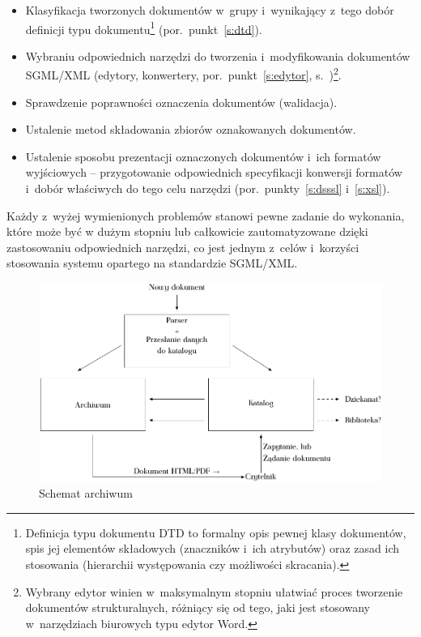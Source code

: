 \documentclass[brudnopis,xodstep]{xmgr}
\begin{document}
\begin{itemize}
\item Klasyfikacja tworzonych dokumentów w~grupy i~wynikający z~tego
  dobór definicji typu dokumentu\footnote{Definicja typu dokumentu DTD
    to formalny opis pewnej klasy dokumentów, spis jej elementów
    składowych (znaczników i~ich atrybutów) oraz zasad ich stosowania
    (hierarchii występowania czy możliwości skracania).}
  (por.~punkt~\ref{s:dtd}).
\item Wybraniu odpowiednich narzędzi do tworzenia i~modyfikowania
  dokumentów SGML/XML (edytory, konwertery, por.~punkt~\ref{s:edytor},
  s.~\pageref{s:edytor})\footnote{Wybrany edytor winien w~maksymalnym
    stopniu ułatwiać proces tworzenie dokumentów strukturalnych,
    różniący się od tego, jaki jest stosowany w~narzędziach biurowych
    typu edytor Word.}.
\item Sprawdzenie poprawności oznaczenia dokumentów
  (walidacja).
\item Ustalenie metod składowania zbiorów oznakowanych dokumentów.
\item Ustalenie sposobu prezentacji oznaczonych dokumentów i~ich
  formatów wyjściowych -- przygotowanie odpowiednich specyfikacji
  konwersji formatów i~dobór właściwych do tego celu narzędzi
  (por.~punkty~\ref{s:dsssl} i~\ref{s:xsl}).
\end{itemize}

Każdy z~wyżej wymienionych problemów stanowi pewne zadanie do
wykonania, które może być w dużym stopniu lub całkowicie
zautomatyzowane dzięki zastosowaniu odpowiednich narzędzi, co jest
jednym z~celów i~korzyści stosowania systemu opartego na standardzie
SGML/XML.

\begin{figure}[!tbh]
\centering 
\includegraphics[width=.8\hsize]{fig/schemat}
\caption{Schemat archiwum\label{RYS.2}}
\end{figure}
\end{document}
